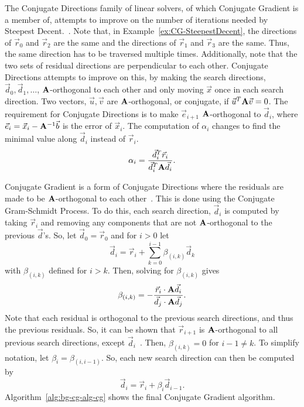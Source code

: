 The Conjugate Directions family of linear solvers, of which Conjugate Gradient is a member of, attempts to improve on the number of iterations needed by Steepest Decent.~\cite{Shewchuk:1994:IntroToCG}.
Note that, in Example~\ref{ex:CG-SteepestDecent}, the directions of \(\vec{r}_0\) and \(\vec{r}_2\) are the same and the directions of \(\vec{r}_1\) and \(\vec{r}_3\) are the same.
Thus, the same direction has to be traversed multiple times.
Additionally, note that the two sets of residual directions are perpendicular to each other.
Conjugate Directions attempts to improve on this, by making the search directions, \(\vec{d}_0, \vec{d}_1, \dots\), \(\mathbf{A}\)-orthogonal to each other and only moving \(\vec{x}\) once in each search direction.
Two vectors, \(\vec{u}, \vec{v}\) are \(\mathbf{A}\)-orthogonal, or conjugate, if \(\vec{u}^T\mathbf{A}\vec{v}=0\).
The requirement for Conjugate Directions is to make \(\vec{e}_{i+1}\) \(\mathbf{A}\)-orthogonal to \(\vec{d}_i\), where \(\vec{e}_i = \vec{x}_i - \mathbf{A}^{-1}\vec{b}\) is the error of \(\vec{x}_i\).
The computation of \(\alpha_i\) changes to find the minimal value along \(\vec{d}_i\) instead of \(\vec{r}_i\).
\[
	\alpha_i = \frac{\vec{d}_i^T\vec{r}_i}{\vec{d}_i^T\mathbf{A}\vec{d}_i}.
\]

Conjugate Gradient is a form of Conjugate Directions where the residuals are made to be \(\mathbf{A}\)-orthogonal to each other~\cite{Shewchuk:1994:IntroToCG}.
This is done using the Conjugate Gram-Schmidt Process.
To do this, each search direction, \(\vec{d}_i\) is computed by taking \(\vec{r}_i\) and removing any components that are not \(\mathbf{A}\)-orthogonal to the previous \(\vec{d}\)'s.
So, let \(\vec{d}_0 = \vec{r}_0\) and for \(i > 0\) let
\[
	\vec{d}_i = \vec{r}_i + \sum_{k=0}^{i-1} \beta_{(i,k)}\vec{d}_k
\]
with \(\beta_{(i,k)}\) defined for \(i > k\).
Then, solving for \(\beta_{(i,k)}\) gives
\[
	\beta_{(i,k)} = -\frac{\vec{r}_i\cdot\mathbf{A}\vec{d}_i}{\vec{d}_j\cdot\mathbf{A}\vec{d}_j}.
\]
Note that each residual is orthogonal to the previous search directions, and thus the previous residuals.
So, it can be shown that \(\vec{r}_{i+1}\) is \(\mathbf{A}\)-orthogonal to all previous search directions, except \(\vec{d}_i\)~\cite{Shewchuk:1994:IntroToCG}.
Then, \(\beta_{(i,k)} = 0\) for \(i-1 \neq k\).
To simplify notation, let \(\beta_i = \beta_{(i,i-1)}\).
So, each new search direction can then be computed by
\[
	\vec{d}_i = \vec{r}_i + \beta_i\vec{d}_{i-1}.
\]
Algorithm~\ref{alg:bg-cg-alg-cg} shows the final Conjugate Gradient algorithm.


